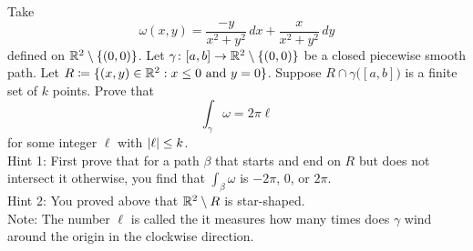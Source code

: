 \begin{exercise}[Hard]
\pagebreak[2]
Take
\begin{equation*}
\omega(x,y) = \frac{-y}{x^2+y^2} \, dx + \frac{x}{x^2+y^2} \, dy
\end{equation*}
defined on ${\mathbb{R}}^2 \setminus \{ (0,0) \}$.  Let $\gamma \colon [a,b] \to {\mathbb{R}}^2
\setminus \{ (0,0) \}$ be a closed piecewise smooth path.
Let $R \coloneqq \{ (x,y) \in {\mathbb{R}}^2 : x \leq 0 \text{ and } y=0 \}$.
Suppose $R \cap \gamma\bigl([a,b]\bigr)$ is a finite set of $k$ points.
Prove that
\begin{equation*}
\int_{\gamma} \omega = 2 \pi \ell 
\end{equation*}
for some integer $\ell$ with $\left\lvert {\ell} \right\rvert \leq k$.\\
Hint 1: First prove that for a path $\beta$ that starts and end on $R$ but
does not intersect it otherwise, you find that $\int_{\beta} \omega$
is $-2\pi$, 0, or $2\pi$.
\\
Hint 2: You proved above that ${\mathbb{R}}^2 \setminus R$ is star-shaped.
\\
Note: The number $\ell$ is called the \emph{} it measures how many
times does $\gamma$ wind around the origin in the clockwise direction.
\end{exercise}
